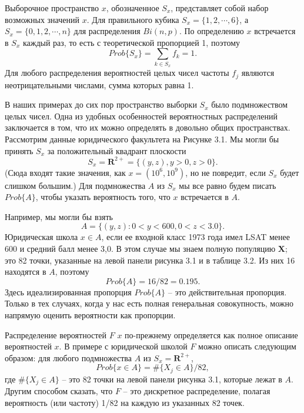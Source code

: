 Выборочное пространство $x$, обозначенное $S_x$, представляет собой набор возможных значений $x$. Для правильного кубика $S_x = \{1, 2, \cdots, 6\}$, а $S_x = \{0, 1, 2, \cdots, n\}$ для распределения $Bi (n, p)$. По определению $x$ встречается в $S_x$ каждый раз, то есть с теоретической пропорцией 1, поэтому
\begin{equation}
    Prob\{S_x\}=\sum_{k\in S_x}f_k=1.
\end{equation}
Для любого распределения вероятностей целых чисел частоты $f_j$ являются неотрицательными числами, сумма которых равна 1. 

В наших примерах до сих пор пространство выборки $S_x$ было подмножеством целых чисел. Одна из удобных особенностей вероятностных распределений заключается в том, что их можно определять в довольно общих пространствах. Рассмотрим данные юридического факультета на Рисунке 3.1. Мы могли бы принять $S_x$ за положительный квадрант плоскости
\begin{equation}
    S_x=\mathbf{R}^{2+}=\{(y,z),y>0,z>0\}.
\end{equation}
(Сюда входят такие значения, как $x = (10^6, 10^9)$, но не повредит, если $S_x$ будет слишком большим.) Для подмножества $A$ из $S_x$ мы все равно будем писать $Prob \{A\}$, чтобы указать вероятность того, что $x$ встречается в $A$. 

Например, мы могли бы взять 
\begin{equation}
    A=\{(y,z):0<y<600,0<z<3.0\}.
\end{equation}
Юридическая школа $x \in A$, если ее входной класс 1973 года имел LSAT менее 600 и средний балл менее 3,0. В этом случае мы знаем полную популяцию $\mathbf{X}$; это 82 точки, указанные на левой панели рисунка 3.1 и в таблице 3.2. Из них 16 находятся в $A$, поэтому 
\begin{equation}
    Prob\{A\}=16/82=0.195.
\end{equation}
Здесь идеализированная пропорция $Prob \{A\}$ -- это действительная пропорция. Только в тех случаях, когда у нас есть полная генеральная совокупность, можно напрямую оценить вероятности как пропорции. 

Распределение вероятностей $F$ $x$ по-прежнему определяется как полное описание вероятностей $x$. В примере с юридической школой $F$ можно описать следующим образом: для любого подмножества $A$ из $S_x = \mathbf{R}^{2+}$, 
\begin{equation}
    Prob\{x\in A\}=\#\{X_j\in A\}/82,
\end{equation}
где $\# \{X_j \in A\}$ -- это 82 точки на левой панели рисунка 3.1, которые лежат в $A$. Другим способом сказать, что $F$ -- это дискретное распределение, полагая вероятность (или частоту) 1/82 на каждую из указанных 82 точек. 

